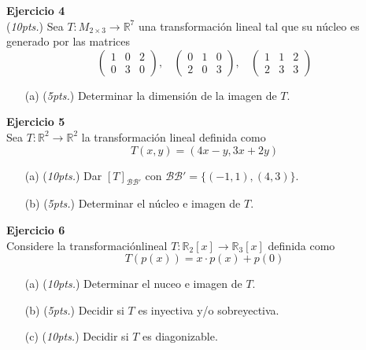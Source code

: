 \documentclass{article}
\newenvironment{problem}[2][Ejercicio]
    { \begin{mdframed}[backgroundcolor=gray!20] \textbf{#1 #2} \\}
    {  \end{mdframed}}
\begin{document}
\begin{problem}{4}
    (\textit{10pts.}) Sea $T: M_{2\times 3} \to \mathbb{R}^7$ una transformación lineal tal que su núcleo es generado por las matrices
    $$
    \begin{pmatrix}
        1 & 0 & 2  \\ 0 & 3 & 0 
    \end{pmatrix}, \ \ \ \ 
    \begin{pmatrix}
        0 & 1 & 0  \\ 2 & 0 & 3 
    \end{pmatrix}, \ \ \ \
    \begin{pmatrix}
        1 & 1 & 2  \\ 2 & 3 & 3 
    \end{pmatrix}
    $$
    \begin{itemize}
        \item[(a)] (\textit{5pts.}) Determinar la dimensión de la imagen de $T$.  
    \end{itemize}
\end{problem}

\begin{problem}{5}
    Sea $T: \mathbb{R}^2 \to \mathbb{R}^2$ la transformación lineal definida como
    $$
    T(x,y) = (4x-y,3x+2y)
    $$
    \begin{itemize}
        \item[(a)] (\textit{10pts.}) Dar $[T]_{\mathcal{BB'}}$ con $\mathcal{B}\mathcal{B'}= \{ (-1,1),(4,3) \}$.
        \item[(b)] (\textit{5pts.}) Determinar el núcleo e imagen de $T$.
    \end{itemize}
\end{problem}

\newpage
\begin{problem}{6}
    Considere la transformaciónlineal $T: \mathbb{R}_2[x] \to \mathbb{R}_3[x]$ definida como
    $$
    T(p(x)) = x \cdot p(x) + p(0)
    $$
    \begin{itemize}
        \item[(a)] (\textit{10pts.}) Determinar el nuceo e imagen de $T$.
        \item[(b)] (\textit{5pts.}) Decidir si $T$ es inyectiva y/o sobreyectiva.
        \item[(c)] (\textit{10pts.}) Decidir si $T$ es diagonizable. 
    \end{itemize}
\end{problem}
\end{document}
